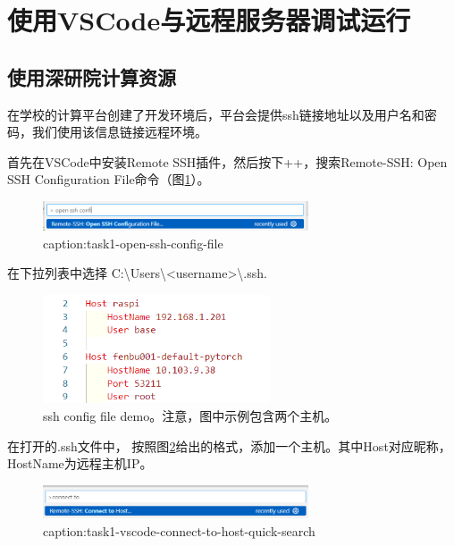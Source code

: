 \section{使用VSCode与远程服务器调试运行}

\subsection{使用深研院计算资源}\label{subsec:task1-vscode-using-sigs-resources}
在学校的计算平台创建了开发环境后，平台会提供ssh链接地址以及用户名和密码，我们使用该信息链接远程环境。

首先在VSCode中安装Remote SSH插件，然后按下++，搜索Remote-SSH: Open SSH Configuration File命令（图\ref{fig:task1-open-ssh-config-file}）。
\begin{figure}[htbp]
	\centering
	\includegraphics[width=0.7\textwidth]{figures/task1-open-ssh-config-file.png}
	\caption{caption:task1-open-ssh-config-file}
	\label{fig:task1-open-ssh-config-file}
\end{figure}

在下拉列表中选择 C:\textbackslash Users\textbackslash <username>\textbackslash .ssh.

\begin{figure}[htbp]
	\centering
	\includegraphics[width=0.6\textwidth]{figures/task1-ssh-config-file-demo.png}
	\caption{ssh config file demo。注意，图中示例包含两个主机。}
	\label{fig:task1-ssh-config-file-demo}
\end{figure}

在打开的.ssh文件中， 按照图\ref*{fig:task1-ssh-config-file-demo}给出的格式，添加一个主机。其中Host对应昵称，HostName为远程主机IP。

\begin{figure}[htbp]
	\centering
	\includegraphics[width=0.7\textwidth]{figures/task1-vscode-connect-to-host-quick-search.png}
	\caption{caption:task1-vscode-connect-to-host-quick-search}
	\label{fig:task1-vscode-connect-to-host-quick-search}
\end{figure}

